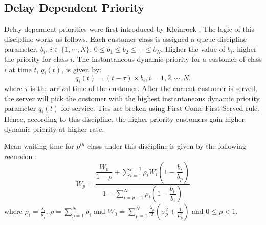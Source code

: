 \documentclass[letterpaper, 10 pt, conference]{ieeeconf}  %
\begin{document}
\subsection{Delay Dependent Priority} 
Delay dependent priorities were first introduced by Kleinrock \cite{Kleinrock1964}. The logic of this discipline works as follows. Each customer class is assigned a queue discipline parameter, $b_i$, $i \in \{1, \cdots, N\}$, $0 \le b_1 \le b_2 \le \cdots \le b_N$. Higher the value of $b_i$, higher the priority for class $i$. The instantaneous dynamic priority for a customer of class $i$ at time $t$, $q_i(t)$, is given by: 
\begin{equation}
q_i(t) = (t-\tau)\times b_i, i = 1,2, \cdots, N.
\label{ddpinst}
\end{equation}
where $\tau$ is the arrival time of the customer. After the current customer is served, the server will pick the customer with the highest instantaneous dynamic priority parameter $q_i(t)$ for service. Ties are broken using First-Come-First-Served rule. Hence, according to this discipline, the higher priority customers gain higher dynamic priority at higher rate.

Mean waiting time for $p^{th}$ class under this discipline is given by the following recursion \cite{Kleinrock1964}:
\begin{equation}\label{eqn:DDP_recursion}
W_p = \dfrac{\dfrac{W_0}{1-\rho} + \displaystyle\sum_{i=1}^{p-1} \rho_i W_i\left(1-\dfrac{b_i}{b_p}\right)}{1-\displaystyle\sum_{i=p+1}^{N}\rho_i\left(1-\dfrac{b_p}{b_i}\right)}
\end{equation}
where $\rho_i = \frac{\lambda_i}{\mu_i}$, $\rho = \sum_{p=1}^N\rho_i$ and $W_0 = \sum_{p=1}^N\frac{\lambda_p}{2}\left(\sigma_p^2 + \frac{1}{\mu_p^2} \right)$ and $0\leq \rho <  1$.
\end{document}
